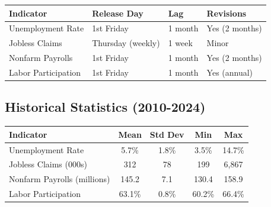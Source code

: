 \documentclass[12pt,a4paper]{article}
\begin{document}
\begin{table}[H]
\centering
\begin{tabular}{@{}llll@{}}
\toprule
\textbf{Indicator} & \textbf{Release Day} & \textbf{Lag} & \textbf{Revisions} \\
\midrule
Unemployment Rate & 1st Friday & 1 month & Yes (2 months) \\
Jobless Claims & Thursday (weekly) & 1 week & Minor \\
Nonfarm Payrolls & 1st Friday & 1 month & Yes (2 months) \\
Labor Participation & 1st Friday & 1 month & Yes (annual) \\
\bottomrule
\end{tabular}
\end{table}

\subsection{Historical Statistics (2010-2024)}

\begin{table}[H]
\centering
\begin{tabular}{@{}lcccc@{}}
\toprule
\textbf{Indicator} & \textbf{Mean} & \textbf{Std Dev} & \textbf{Min} & \textbf{Max} \\
\midrule
Unemployment Rate & 5.7\% & 1.8\% & 3.5\% & 14.7\% \\
Jobless Claims (000s) & 312 & 78 & 199 & 6,867 \\
Nonfarm Payrolls (millions) & 145.2 & 7.1 & 130.4 & 158.9 \\
Labor Participation & 63.1\% & 0.8\% & 60.2\% & 66.4\% \\
\bottomrule
\end{tabular}
\end{table}
\end{document}
